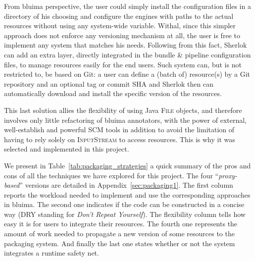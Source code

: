 \documentclass{article}
\newcommand{\ID}[1]{{\textsc{#1}}}
\begin{document}
From bluima perspective, the user could simply install the configuration files in a directory of his
choosing and configure the engines with paths to the actual resources without using any system-wide
variable. Withal, since this simpler approach does not enforce any versioning mechanism at all, the
user is free to implement any system that matches his needs. Following from this fact, Sherlok can
add an extra layer, directly integrated in the bundle \& pipeline configuration files, to manage
resources easily for the end users. Such system can, but is not restricted to, be based on Git: a
user can define a (batch of) resource(s) by a Git repository and an optional tag or commit SHA and
Sherlok then can automatically download and install the specific version of the resources.

This last solution allies the flexibility of using Java \ID{File} objects, and therefore involves
only little refactoring of bluima annotators, with the power of external, well-establish and
powerful SCM tools in addition to avoid the limitation of having to rely solely on \ID{InputStream}
to access resources. This is why it was selected and implemented in this project.

We present in Table~\ref{tab:packaging_strategies} a quick summary of the pros and cons of all the
techniques we have explored for this project. The four ``\emph{proxy-based}'' versions are detailed
in Appendix~\ref{sec:packaging1}. The first column reports the workload needed to implement and use
the corresponding approaches in bluima. The second one indicates if the code can be constructed in a
concise way (DRY standing for \emph{Don't Repeat Yourself}). The flexibility column tells how easy
it is for users to integrate their resources. The fourth one represents the amount of work needed to
propagate a new version of some resources to the packaging system. And finally the last one states
whether or not the system integrates a runtime safety net.
\end{document}
